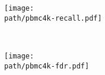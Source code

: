 \documentclass{article}
\begin{document}
\newcommand{\path}{../../simulations/results-sim/pics}

\begin{figure}
    \begin{subfigure}{\textwidth}
    \texttt{[image: \\path/pbmc4k-recall.pdf]}
    \caption{}
    \end{subfigure} \\[0.1in]
    \begin{subfigure}{\textwidth}
    \texttt{[image: \\path/pbmc4k-fdr.pdf]}
    \caption{}
    \end{subfigure}
\end{figure}
\end{document}

